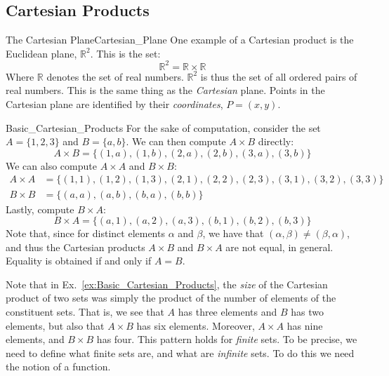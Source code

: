     \subsection{Cartesian Products}
        \begin{lexample}{The Cartesian Plane}{Cartesian_Plane}
            One example of a Cartesian product is the Euclidean plane,
            $\mathbb{R}^{2}$. This is the set:
            \begin{equation}
                \mathbb{R}^{2}=\mathbb{R}\times\mathbb{R}
            \end{equation}
            Where $\mathbb{R}$ denotes the set of real numbers.
            $\mathbb{R}^{2}$ is thus the set of all ordered pairs of real
            numbers. This is the same thing as the \textit{Cartesian}
            plane. Points in the Cartesian plane are identified by their
            \textit{coordinates}, $P=(x,y)$.
        \end{lexample}
        \begin{lexample}{}{Basic_Cartesian_Products}
            For the sake of computation, consider the set $A=\{1,2,3\}$ and
            $B=\{a,b\}$. We can then compute $A\times{B}$ directly:
            \begin{equation}
                A\times{B}=\big\{(1,a),(1,b),(2,a),(2,b),(3,a),(3,b)\big\}
            \end{equation}
            We can also compute $A\times{A}$ and $B\times{B}$:
            \begin{subequations}
                \begin{align}
                    A\times{A}&=\big\{(1,1),(1,2),(1,3),
                                      (2,1),(2,2),(2,3),
                                      (3,1),(3,2),(3,3)\big\}\\
                    B\times{B}&=\big\{(a,a),(a,b),(b,a),(b,b)\big\}
                \end{align}
            \end{subequations}
            Lastly, compute $B\times{A}$:
            \begin{equation}
                B\times{A}=\big\{
                    (a,1),(a,2),(a,3),
                    (b,1),(b,2),(b,3)\big\}
            \end{equation}
            Note that, since for distinct elements $\alpha$
            and $\beta$, we have that
            $(\alpha,\beta)\ne(\beta,\alpha)$, and thus
            the Cartesian products $A\times{B}$ and $B\times{A}$
            are not equal, in general. Equality is obtained
            if and only if $A=B$.
        \end{lexample}
        Note that in
        Ex.~\ref{ex:Basic_Cartesian_Products}, the
        \textit{size} of the Cartesian product of two sets
        was simply the product of the number of elements of
        the constituent sets. That is, we see that $A$ has
        three elements and $B$ has two elements, but also that
        $A\times{B}$ has six elements. Moreover, $A\times{A}$
        has nine elements, and $B\times{B}$ has four. This
        pattern holds for \textit{finite} sets. To be precise,
        we need to define what finite sets are, and what
        are \textit{infinite} sets. To do this we need the
        notion of a function.
